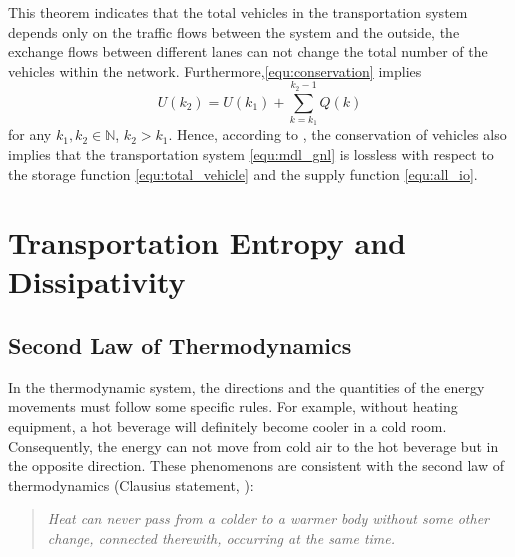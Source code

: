 \documentclass[preprint,authoryear,12pt]{elsarticle}
\begin{document}
This theorem indicates that the total vehicles in the transportation system depends only on the traffic flows between the system and the outside, the exchange flows between different lanes can not change the total number of the vehicles within the network. Furthermore,\eqref{equ:conservation} implies
\begin{equation}\label{equ:conservation_ex}
U(k_2) = U(k_1)+\sum_{k=k_1}^{k_2-1}Q(k)
\end{equation}
for any $k_1,k_2\in\mathbb{N}$, $k_2>k_1$. Hence, according to \citep{willems_dissipative_1972-1}, the conservation of vehicles also implies that the transportation system \eqref{equ:mdl_gnl} is lossless with respect to the storage function \eqref{equ:total_vehicle} and the supply function \eqref{equ:all_io}.

\section{Transportation Entropy and Dissipativity}

\subsection{Second Law of Thermodynamics}

In the thermodynamic system, the directions and the quantities of the energy movements must follow some specific rules. For example, without heating equipment, a hot beverage will definitely become cooler in a cold room. Consequently, the energy can not move from cold air to the hot beverage but in the opposite direction. These phenomenons are consistent with the second law of thermodynamics (Clausius statement, \citet{clausius_mechanical_1867}):
\begin{quotation}
\it Heat can never pass from a colder to a warmer body without some other change, connected therewith, occurring at the same time.
\end{quotation}
\end{document}
